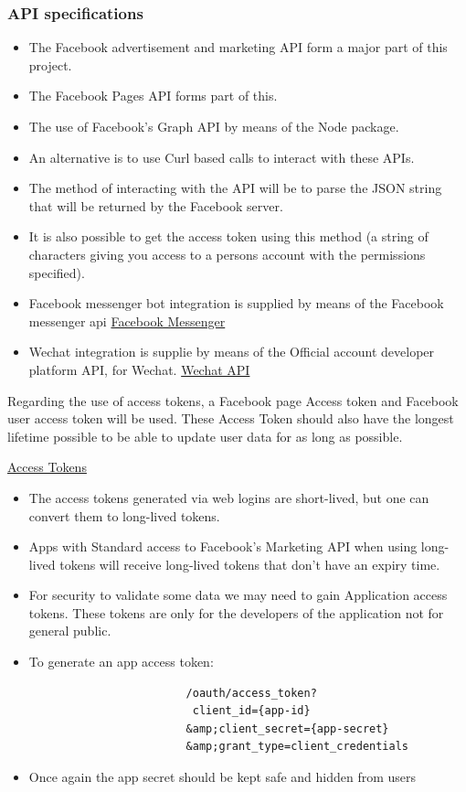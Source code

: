 \documentclass{article}
\begin{document}
		\subsubsection{API specifications}
		\begin{itemize}
		
		
			\item The Facebook advertisement and marketing API form a major part of this project.
			
			\item The Facebook Pages API forms part of this.
			\item The use of Facebook's Graph API by means of the Node package.
			\item An alternative is to use Curl based calls to interact with these APIs.
			\item The method of interacting with the API will be to parse the JSON string that will be returned by the Facebook server.
			\item It is also possible to get the access token using this method (a string of characters giving you access to a persons  account with the permissions specified).
			\item Facebook messenger bot integration is supplied by means of the Facebook messenger api \href{https://developers.facebook.com/docs/messenger-platform}{Facebook Messenger}
			\item Wechat integration is supplie by means of the Official account developer platform API, for Wechat. \href{http://dev.wechat.com/}{Wechat API}
		\end{itemize}
			Regarding the use of  access tokens, a Facebook page Access token and Facebook user access token will be used. These Access Token should also have the longest lifetime possible to be able to update user data for as long as possible.

			\href{https://developers..com/docs/-login/access-tokens}{Access Tokens}
			\begin{itemize}
				\item The access tokens generated via web logins are short-lived, but one can convert them to long-lived tokens.
				\item Apps with Standard access to Facebook's Marketing API when using long-lived tokens will receive long-lived tokens that don't have an expiry time.
				\item For security to validate some data we may need to gain Application access tokens. These tokens are only for the developers of the application not for general public.
				\item To generate an app access token:
					\begin{verbatim}
						/oauth/access_token?
					     client_id={app-id}
					    &amp;client_secret={app-secret}
					    &amp;grant_type=client_credentials
					\end{verbatim}
				\item Once again the app secret should be kept safe and hidden from users
			\end{itemize}
\end{document}
